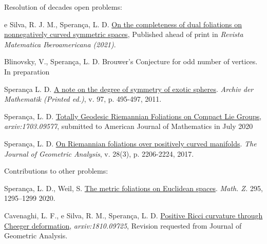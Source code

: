 \documentclass[10pt]{article}
\newenvironment{innerlist}[1][\enskip\textbullet]%
{\begin{compactitem}[#1]}{\end{compactitem}}
\begin{document}
	
	\begin{enumerate}
		
		
		\item 		Resolution of decades open problems:
		\begin{innerlist}[-]
			\item  e Silva, R. J. M., Sperança, L. D. \href{https://ems.press/journals/rmi/articles/1567309}{On the completeness of dual foliations on nonnegatively curved symmetric spaces}, Published ahead of print in \textit{Revista Matematica Iberoamericana (2021)}.
			
			
			\item Blinovsky, V., Sperança, L. D.
			Brouwer's Conjecture for odd number of vertices. In preparation
			
			
			
			\item Sperança L. D. \href{https://link.springer.com/article/10.1007/s00013-011-0317-3}{A note on the degree of symmetry of exotic spheres}. {\textit{Archiv der Mathematik (Printed ed.)},  v. 97, p. 495-497, 2011}.
			
			
			
			
			\item Sperança, L. D. \href{https://arxiv.org/abs/1703.09577}{Totally Geodesic Riemannian Foliations on Compact Lie Groups}, \textit{{arxiv:1703.09577}}, submitted to  American Journal of Mathematics in July 2020
			
			
			\item Sperança, L. D. \href{https://link.springer.com/article/10.1007/s12220-017-9901-5}{On Riemannian foliations over positively curved manifolds}. {\textit{The Journal of Geometric Analysis}, v. 28(3), p. 2206-2224, 2017}.
			
		\end{innerlist}
		
		
		\item Contributions to other problems:
		\begin{innerlist}[-]
			
			
			\item Sperança, L. D., Weil, S.  \href{https://link.springer.com/article/10.1007/s00209-019-02425-3}{The metric foliations on Euclidean spaces}. \textit{Math. Z.} 295, 1295–1299 2020.
			
			
			\item Cavenaghi, L. F., e Silva, R. M., Sperança, L. D. \href{https://arxiv.org/abs/1810.09725}{Positive Ricci curvature through Cheeger deformation},
			\textit{{arxiv:1810.09725}}, Revision requested from  Journal of Geometric Analysis.
			

\end{innerlist}
\end{enumerate}
\end{document}
